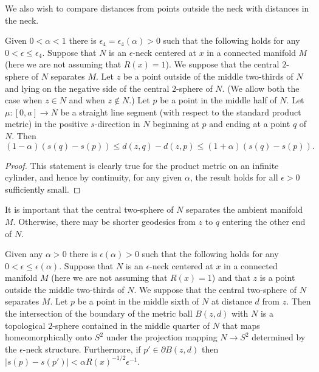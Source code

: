 We also wish to compare distances from points outside the neck with
distances in the neck.

\begin{lemma}
\label{lem:neck-distance-comparison-external-point}
\label{neckdistcomp}
Given $0<\alpha<1$ there is $\epsilon_4=\epsilon_4(\alpha)>0$ such
that the following holds for any $0<\epsilon\le \epsilon_4$. Suppose
that $N$ is an $\epsilon$-neck centered at $x$ in a connected
manifold $M$ (here we are not assuming that $R(x)=1$). We suppose
that the central $2$-sphere of $N$ separates $M$. Let $z$ be a point
outside of  the middle two-thirds of $N$ and lying on the negative
side of the central $2$-sphere of $N$. (We allow both the case when
$z\in N$ and when $z\not\in N$.) Let $p$ be a point in the middle
half of $N$. Let $\mu\colon [0,a]\to N$ be a straight line segment
(with respect to the standard product metric) in the positive
$s$-direction in $N$ beginning at $p$ and ending at a point $q$ of
$N$. Then
$$(1-\alpha)(s(q)-s(p))\le d(z,q)-d(z,p)\le (1+\alpha)(s(q)-s(p)).$$
\end{lemma}


\begin{proof}
This statement is clearly true for the product metric on an infinite
cylinder, and hence by continuity, for any given $\alpha$, the
result holds for all $\epsilon>0$ sufficiently small.
\end{proof}



 It is important that the central two-sphere of
$N$ separates the ambient manifold $M$. Otherwise, there may be
shorter geodesics from $z$ to $q$ entering the other end of $N$.

\begin{lemma}
\label{lem:metric-sphere-meets-neck-topologically}
\label{topiso}
Given any $\alpha>0$  there is $\epsilon(\alpha)>0$ such that  the
following holds for any $0<\epsilon\le \epsilon(\alpha)$. Suppose
that $N$ is an $\epsilon$-neck centered at $x$ in a connected
manifold $M$ (here we are not assuming that $R(x)=1$) and that $z$
is a point outside the middle two-thirds of $N$. We suppose that the
central two-sphere of $N$ separates $M$. Let $p$ be a point in the
middle sixth of $N$ at distance $d$ from $z$. Then the intersection
of the boundary of the metric ball $B(z,d)$ with $N$ is a
topological $2$-sphere contained in the middle quarter of $N$ that
maps homeomorphically onto $S^2$ under the projection mapping $N\to
S^2$ determined by the $\epsilon$-neck structure. Furthermore, if
$p'\in \partial B(z,d)$ then $|s(p)-s(p')|<\alpha
R(x)^{-1/2}\epsilon^{-1}$.
\end{lemma}

